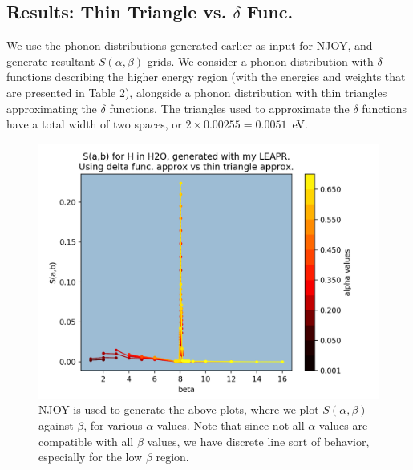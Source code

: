 \documentclass[Master.tex]{subfiles}
\begin{document}
 

\subsection*{Results: Thin Triangle vs. $\delta$ Func.}
We use the phonon distributions generated earlier as input for NJOY, and generate resultant $S(\alpha,\beta)$ grids. We consider a phonon distribution with $\delta$ functions describing the higher energy region (with the energies and weights that are presented in Table 2), alongside a phonon distribution with thin triangles approximating the $\delta$ functions. The triangles used to approximate the $\delta$ functions have a total width of two spaces, or $2\times0.00255=0.0051$~eV.

            \begin{figure}[h]
              \begin{center}
              \includegraphics[scale=0.6]{sab_thinTriangle_and_delta_all_AB}
                \caption{NJOY is used to generate the above plots, where we plot $S(\alpha,\beta)$ against $\beta$, for various $\alpha$ values. Note that since not all $\alpha$ values are compatible with all $\beta$ values, we have discrete line sort of behavior, especially for the low $\beta$ region. }
              \label{fig:sabThinTriangleAllAB}
              \end{center}
            \end{figure}
\end{document}
